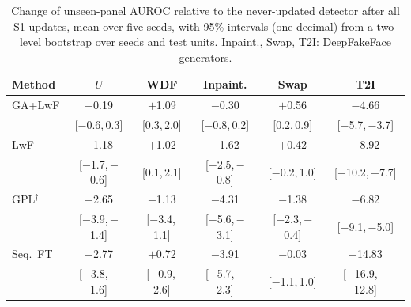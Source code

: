 \documentclass[journal]{IEEEtran}
\begin{document}
\begin{table}[t]
\caption{Change of unseen-panel AUROC relative to the never-updated detector after all S1 updates, mean over five seeds, with 95\% intervals (one decimal) from a two-level bootstrap over seeds and test units. Inpaint., Swap, T2I: DeepFakeFace generators.}
\label{tab:retention}
\centering
\footnotesize
\setlength{\tabcolsep}{0.9pt}
\begin{tabular}{@{}lccccc@{}}
\toprule
Method & $U$ & WDF & Inpaint. & Swap & T2I \\
\midrule
GA+LwF & $-$0.19 & $+$1.09 & $-$0.30 & $+$0.56 & $-$4.66 \\
 & {\scriptsize[$-$0.6,\,0.3]} & {\scriptsize[0.3,\,2.0]} & {\scriptsize[$-$0.8,\,0.2]} & {\scriptsize[0.2,\,0.9]} & {\scriptsize[$-$5.7,\,$-$3.7]} \\[1pt]
LwF & $-$1.18 & $+$1.02 & $-$1.62 & $+$0.42 & $-$8.92 \\
 & {\scriptsize[$-$1.7,\,$-$0.6]} & {\scriptsize[0.1,\,2.1]} & {\scriptsize[$-$2.5,\,$-$0.8]} & {\scriptsize[$-$0.2,\,1.0]} & {\scriptsize[$-$10.2,\,$-$7.7]} \\[1pt]
GPL$^\dagger$ & $-$2.65 & $-$1.13 & $-$4.31 & $-$1.38 & $-$6.82 \\
 & {\scriptsize[$-$3.9,\,$-$1.4]} & {\scriptsize[$-$3.4,\,1.1]} & {\scriptsize[$-$5.6,\,$-$3.1]} & {\scriptsize[$-$2.3,\,$-$0.4]} & {\scriptsize[$-$9.1,\,$-$5.0]} \\[1pt]
Seq.\ FT & $-$2.77 & $+$0.72 & $-$3.91 & $-$0.03 & $-$14.83 \\
 & {\scriptsize[$-$3.8,\,$-$1.6]} & {\scriptsize[$-$0.9,\,2.6]} & {\scriptsize[$-$5.7,\,$-$2.3]} & {\scriptsize[$-$1.1,\,1.0]} & {\scriptsize[$-$16.9,\,$-$12.8]} \\[1pt]
\bottomrule
\end{tabular}
\end{table}
\end{document}
